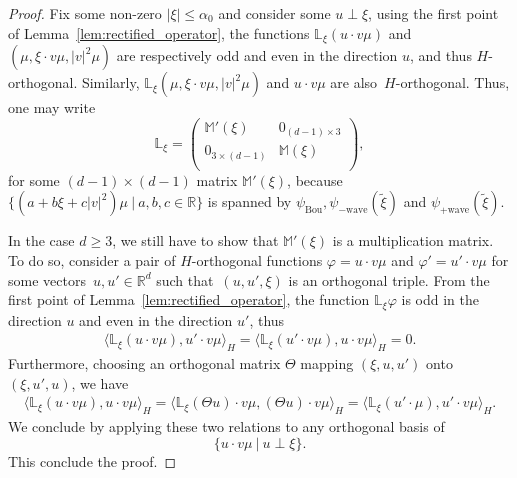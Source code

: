 \documentclass[10pt]{amsart}
\theoremstyle{definition}\newtheorem{defi}[theo]{Definition}\newtheorem{rema}[theo]{Remark}\newtheorem{exam}[theo]{Example}\newtheorem{exem}[theo]{Example}\newtheorem{nota}[theo]{Notation}
\newcommand{\Wave}{\mathrm{wave}}
\newcommand{\Bou}{\mathrm{Bou}}
\newcommand{\R}{\mathbb{R}}
\newcommand{\rectL}{\mathbb{L}}
\newcommand{\rectsL}{\mathbb{M}}
\newcommand{\Ss}{H}
\renewcommand*\le{\leqslant}
\renewcommand*\ge{\geqslant}
\begin{document}
\begin{proof}
Fix some non-zero $| \xi | \le \alpha_0$ and consider some $u \perp \xi$, using the first point of Lemma~\ref{lem:rectified_operator}, the functions $\rectL_{\xi} (u \cdot v \mu)$ and~$(\mu, \xi \cdot v \mu, |v|^2 \mu)$ are respectively odd and even in the direction $u$, and thus $\Ss$-orthogonal. Similarly, $\rectL_\xi (\mu, \xi \cdot v \mu, |v|^2 \mu)$ and $u \cdot v \mu$ are also~$\Ss$-orthogonal. Thus, one may write
\[
\rectL_{\xi} = \left(
\begin{matrix}
\rectsL'(\xi) & 0_{(d-1) \times 3} \\
0_{3 \times (d-1)} & \rectsL(\xi) \\
\end{matrix}
\right),
\]
for some $(d-1) \times (d-1)$ matrix $\rectsL'(\xi)$, because $\{(a + b \xi + c | v |^2)\mu~|~a, b, c \in \R \}$ is spanned by $\psi_{\Bou}, \psi_{- \Wave}(\widetilde{\xi} )$ and $\psi_{+\Wave}(\widetilde{\xi})$.


In the case $d \ge 3$, we still have to show that $\rectsL'(\xi)$ is a multiplication matrix. To do so, consider a pair of $\Ss$-orthogonal functions $\varphi = u \cdot v \mu$ and $\varphi' = u' \cdot v \mu$ for some vectors~$u, u' \in \R^d$ such that~$(u, u', \xi)$ is an orthogonal triple. From the first point of Lemma~\ref{lem:rectified_operator}, the function $\rectL_{\xi} \varphi$ is odd in the direction $u$ and even in the direction $u'$, thus
\begin{gather*}
\big\langle \rectL_\xi (u \cdot v \mu), u' \cdot v \mu \big\rangle_{\Ss} = \big\langle \rectL_\xi \left(u' \cdot v \mu\right), u \cdot v \mu \big\rangle_{\Ss} = 0.
\end{gather*}
Furthermore, choosing an orthogonal matrix $\Theta$ mapping $(\xi, u, u')$ onto $(\xi, u', u)$, we have
\begin{align*}
\big\langle \rectL_\xi (u \cdot v \mu), u \cdot v \mu \big\rangle_{\Ss} = \big\langle \rectL_\xi (\Theta u) \cdot v \mu, (\Theta u) \cdot v \mu \big\rangle_{\Ss} = \big\langle \rectL_\xi \left(u' \cdot \mu\right), u' \cdot v \mu \big\rangle_{\Ss}.
\end{align*}
We conclude by applying these two relations to any orthogonal basis of
\[
\Big\{ u \cdot v \mu~|~u \perp \xi \Big \}.
\]
This conclude the proof.
\end{proof}
\end{document}
